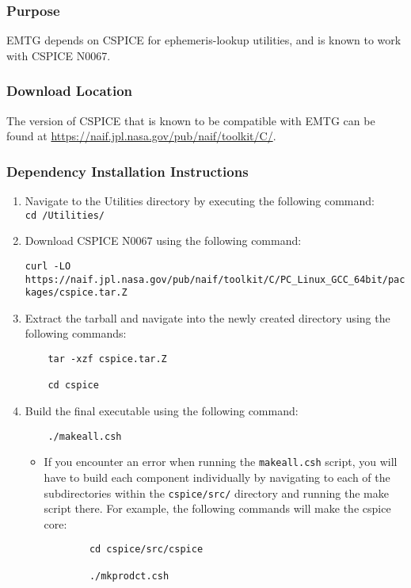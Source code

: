 
\subsubsection{Purpose}

\ac{EMTG} depends on CSPICE for ephemeris-lookup utilities, and is known to work with CSPICE N0067. 

\subsubsection{Download Location}

The version of CSPICE that is known to be compatible with \ac{EMTG} can be found at \url{https://naif.jpl.nasa.gov/pub/naif/toolkit/C/}.

\subsubsection{Dependency Installation Instructions}

\begin{enumerate}
	\item Navigate to the Utilities directory by executing the following command: \\

	\texttt{cd /Utilities/}
	\item Download CSPICE N0067 using the following command:

	\texttt{curl -LO https://naif.jpl.nasa.gov/pub/naif/toolkit/C/PC\_Linux\_GCC\_64bit/packages\newline\indent /cspice.tar.Z}

	\item Extract the tarball and navigate into the newly created directory using the following commands:
	\begin{verbatim}
	tar -xzf cspice.tar.Z

	cd cspice
	\end{verbatim}   

	\item Build the final executable using the following command:
	\begin{verbatim}
	./makeall.csh
	\end{verbatim}
	\begin{itemize}
		\item If you encounter an error when running the \texttt{makeall.csh} script, you will have to build each component individually by navigating to each of the subdirectories within the \texttt{cspice/src/} directory and running the make script there. For example, the following commands will make the cspice core:
		\begin{verbatim}
		cd cspice/src/cspice

		./mkprodct.csh
		\end{verbatim}
	\end{itemize}
\end{enumerate}